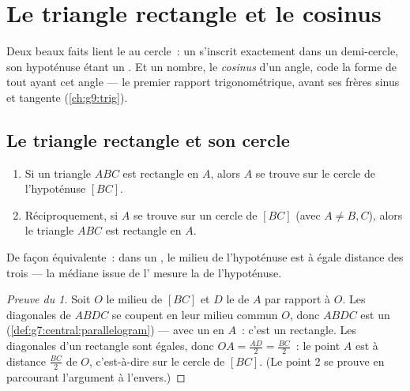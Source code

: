 \chapter{Le triangle rectangle et le cosinus}\label{ch:g8:cosine}

Deux beaux faits lient le  au cercle~: un  s'inscrit exactement dans un demi-cercle, son hypoténuse
étant un . Et un nombre, le \emph{cosinus} d'un angle, code
la forme de tout  ayant cet angle --- le premier
rapport trigonométrique, avant ses frères sinus et tangente
(\cref{ch:g9:trig}).

\section{Le triangle rectangle et son cercle}

\begin{theorem}\label{thm:g8:cosine:circle}
\begin{enumerate}
  \item Si un triangle $ABC$ est rectangle en $A$, alors $A$ se
        trouve sur le cercle de  l'hypoténuse $[BC]$.
  \item Réciproquement, si $A$ se trouve sur un cercle de 
        $[BC]$ (avec $A \neq B, C$), alors le triangle $ABC$ est
        rectangle en $A$.
\end{enumerate}
De façon équivalente~: dans un , le milieu de
l'hypoténuse est à égale distance des trois  --- la médiane
issue de l' mesure la  de l'hypoténuse.
\end{theorem}

\begin{proof}[Preuve du 1]
Soit $O$ le milieu de $[BC]$ et $D$ le  de $A$ par rapport
à $O$. Les diagonales de $ABDC$ se coupent en leur milieu commun $O$,
donc $ABDC$ est un 
(\cref{def:g7:central:parallelogram}) --- avec un  en
$A$~: c'est un rectangle. Les diagonales d'un rectangle sont égales,
donc $OA = \frac{AD}{2} = \frac{BC}{2}$~: le point $A$ est à
distance $\frac{BC}{2}$ de $O$, c'est-à-dire sur le cercle de
 $[BC]$. (Le point 2 se prouve en parcourant l'argument à
l'envers.)
\end{proof}

